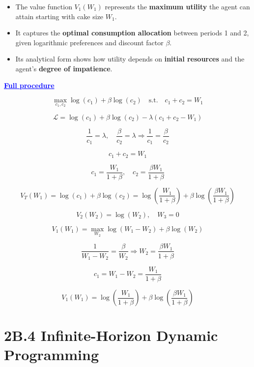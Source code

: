 \documentclass[12pt]{article}
\begin{document}
\begin{itemize}
    \item The value function \( V_1(W_1) \) represents the \textbf{maximum utility} the agent can attain starting with cake size \( W_1 \).
    
    \item It captures the \textbf{optimal consumption allocation} between periods 1 and 2, given logarithmic preferences and discount factor \( \beta \).
    
    \item Its analytical form shows how utility depends on \textbf{initial resources} and the agent’s \textbf{degree of impatience}.
\end{itemize}


\textcolor{blue}{\textbf{\uline{Full procedure}}}

{\color{blue}
\[
\max_{c_1, c_2} \log(c_1) + \beta \log(c_2)
\quad \text{s.t.} \quad c_1 + c_2 = W_1
\]

\[
\mathcal{L} = \log(c_1) + \beta \log(c_2) - \lambda(c_1 + c_2 - W_1)
\]

\[
\frac{1}{c_1} = \lambda, \quad \frac{\beta}{c_2} = \lambda
\Rightarrow \frac{1}{c_1} = \frac{\beta}{c_2}
\]

 \quad
\[
c_1 + c_2 = W_1
\]

\[
c_1 = \frac{W_1}{1 + \beta}, \quad c_2 = \frac{\beta W_1}{1 + \beta}
\]

\[
V_T(W_1) = \log(c_1) + \beta \log(c_2)
= \log\left( \frac{W_1}{1 + \beta} \right) + \beta \log\left( \frac{\beta W_1}{1 + \beta} \right)
\]

\[
V_2(W_2) = \log(W_2), \quad W_3 = 0
\]

\[
V_1(W_1) = \max_{W_2} \log(W_1 - W_2) + \beta \log(W_2)
\]

\[
\frac{1}{W_1 - W_2} = \frac{\beta}{W_2}
\Rightarrow W_2 = \frac{\beta W_1}{1 + \beta}
\]

\[
c_1 = W_1 - W_2 = \frac{W_1}{1 + \beta}
\]

\[
V_1(W_1) = \log\left( \frac{W_1}{1 + \beta} \right) + \beta \log\left( \frac{\beta W_1}{1 + \beta} \right)
\]
}

\section*{\noindent\textbf{2B.4 Infinite-Horizon Dynamic Programming}}
\end{document}
